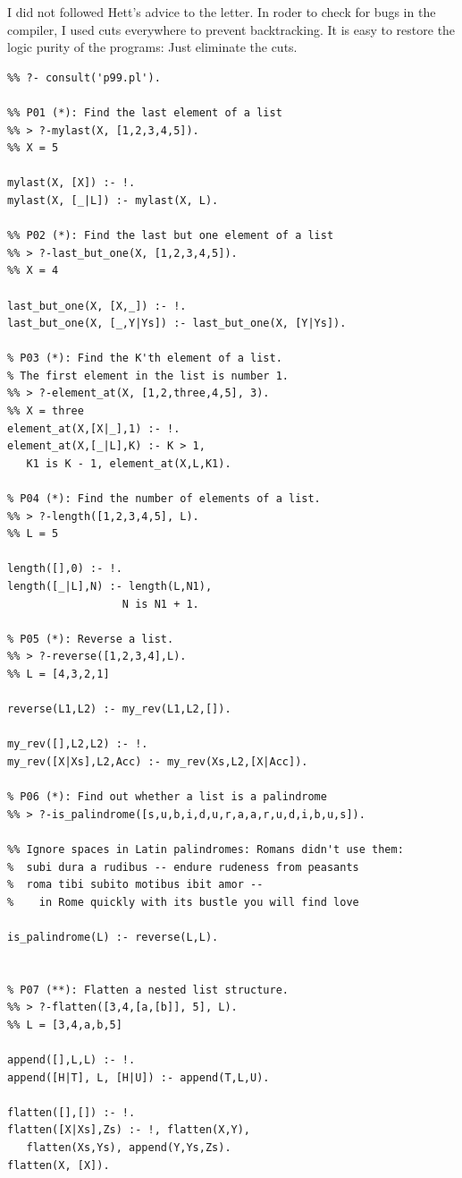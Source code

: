 \documentclass[a4paper,12pt]{book}
\begin{document}
I did not followed Hett's advice to the letter. In roder
to check for bugs in the compiler, I used cuts everywhere
to prevent backtracking. It is easy to restore the logic
purity of the programs: Just eliminate the cuts.

\pagebreak
\begin{verbatim}
%% ?- consult('p99.pl').

%% P01 (*): Find the last element of a list
%% > ?-mylast(X, [1,2,3,4,5]).
%% X = 5

mylast(X, [X]) :- !.
mylast(X, [_|L]) :- mylast(X, L).

%% P02 (*): Find the last but one element of a list
%% > ?-last_but_one(X, [1,2,3,4,5]).
%% X = 4

last_but_one(X, [X,_]) :- !.
last_but_one(X, [_,Y|Ys]) :- last_but_one(X, [Y|Ys]).

% P03 (*): Find the K'th element of a list.
% The first element in the list is number 1.
%% > ?-element_at(X, [1,2,three,4,5], 3).
%% X = three
element_at(X,[X|_],1) :- !.
element_at(X,[_|L],K) :- K > 1,
   K1 is K - 1, element_at(X,L,K1).

% P04 (*): Find the number of elements of a list.
%% > ?-length([1,2,3,4,5], L).
%% L = 5

length([],0) :- !.
length([_|L],N) :- length(L,N1),
                  N is N1 + 1.

% P05 (*): Reverse a list.
%% > ?-reverse([1,2,3,4],L).
%% L = [4,3,2,1]

reverse(L1,L2) :- my_rev(L1,L2,[]).

my_rev([],L2,L2) :- !.
my_rev([X|Xs],L2,Acc) :- my_rev(Xs,L2,[X|Acc]).

% P06 (*): Find out whether a list is a palindrome
%% > ?-is_palindrome([s,u,b,i,d,u,r,a,a,r,u,d,i,b,u,s]).

%% Ignore spaces in Latin palindromes: Romans didn't use them:
%  subi dura a rudibus -- endure rudeness from peasants
%  roma tibi subito motibus ibit amor -- 
%    in Rome quickly with its bustle you will find love
  
is_palindrome(L) :- reverse(L,L).


% P07 (**): Flatten a nested list structure.
%% > ?-flatten([3,4,[a,[b]], 5], L).
%% L = [3,4,a,b,5]

append([],L,L) :- !.
append([H|T], L, [H|U]) :- append(T,L,U).

flatten([],[]) :- !.
flatten([X|Xs],Zs) :- !, flatten(X,Y),
   flatten(Xs,Ys), append(Y,Ys,Zs).
flatten(X, [X]).


\end{verbatim}
\end{document}

